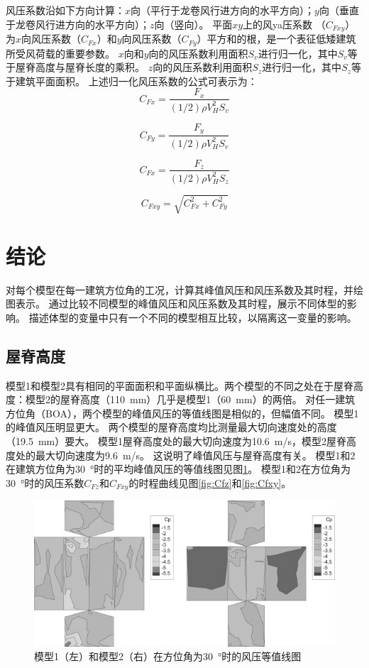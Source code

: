 \documentclass{ctexart}
\begin{document}
风压系数沿如下方向计算：$x$向（平行于龙卷风行进方向的水平方向）；$y$向（垂直于龙卷风行进方向的水平方向）；$z$向（竖向）。
平面$xy$上的风ya压系数 （$C_{Fxy}$）为$x$向风压系数（$C_{Fx}$）和$y$向风压系数（$C_{Fy}$）平方和的根，是一个表征低矮建筑所受风荷载的重要参数。
$x$向和$y$向的风压系数利用面积$S_v$进行归一化，其中$S_v$等于屋脊高度与屋脊长度的乘积。
$z$向的风压系数利用面积$S_z$进行归一化，其中$S_z$等于建筑平面面积。
上述归一化风压系数的公式可表示为：
\begin{equation}
	C_{Fx}=\frac{F_x}{(1/2)\rho V_H^2 S_v}
\end{equation}

\begin{equation}
	C_{Fy}=\frac{F_y}{(1/2)\rho V_H^2 S_v}
\end{equation}

\begin{equation}
	C_{Fx}=\frac{F_z}{(1/2)\rho V_H^2 S_z}
\end{equation}

\begin{equation}
	C_{Fxy}=\sqrt{C_{Fx}^2+C_{Fy}^2}
\end{equation}

\section{结论}
对每个模型在每一建筑方位角的工况，计算其峰值风压和风压系数及其时程，并绘图表示。
通过比较不同模型的峰值风压和风压系数及其时程，展示不同体型的影响。
描述体型的变量中只有一个不同的模型相互比较，以隔离这一变量的影响。

\subsection{屋脊高度}
模型1和模型2具有相同的平面面积和平面纵横比。两个模型的不同之处在于屋脊高度：模型2的屋脊高度（\SI{110}{mm}）几乎是模型1（\SI{60}{mm}）的两倍。
对任一建筑方位角（BOA），两个模型的峰值风压的等值线图是相似的，但幅值不同。
模型1的峰值风压明显更大。
两个模型的屋脊高度均比测量最大切向速度处的高度（\SI{19.5}{mm}）要大。
模型1屋脊高度处的最大切向速度为\SI{10.6}{m/s}，模型2屋脊高度处的最大切向速度为\SI{9.6}{m/s}。
这说明了峰值风压与屋脊高度有关。
模型1和2在建筑方位角为\SI{30}{\degree}时的平均峰值风压的等值线图见图\ref{fig:ppc}。
模型1和2在方位角为\SI{30}{\degree}时的风压系数$C_{Fz}$和$C_{Fxy}$的时程曲线见图\ref{fig:Cfz}和\ref{fig:Cfxy}。
\begin{figure}[h]
\centering
\includegraphics{./fig/4.jpg}
\caption{模型1（左）和模型2（右）在方位角为\SI{30}{\degree}时的风压等值线图}
\label{fig:ppc}
\end{figure}
\end{document}
